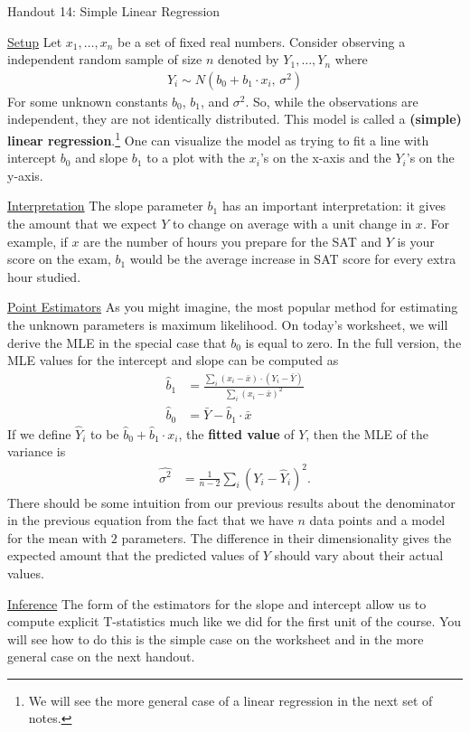 \documentclass{tufte-handout}
\begin{document}
\justify

{\LARGE Handout 14: Simple Linear Regression}

\vspace*{18pt}

\noindent
\underline{Setup}
Let $x_1, \ldots, x_n$ be a set of fixed real numbers.
Consider observing a independent random sample of size $n$ denoted
by $Y_1, \ldots, Y_n$ where
\begin{align*}
Y_i \sim N(b_0 + b_1 \cdot x_i, \, \sigma^2)
\end{align*}
For some unknown constants $b_0$, $b_1$, and $\sigma^2$. So, while
the observations are independent, they are not identically distributed.
This model is called a \textbf{(simple) linear regression}.\footnote{
  We will see the more general case of a linear regression in the next
  set of notes.
}
One can visualize the model as trying to fit a line with intercept $b_0$
and slope $b_1$ to a plot with the $x_i$'s on the x-axis and the $Y_i$'s on
the y-axis. 

\vspace*{12pt}

\noindent
\underline{Interpretation}
The slope parameter $b_1$ has an important interpretation: it gives
the amount that we expect $Y$ to change on average with a unit change
in $x$. For example, if $x$ are the number of hours you prepare for the
SAT and $Y$ is your score on the exam, $b_1$ would be the average
increase in SAT score for every extra hour studied.

\vspace*{12pt}

\noindent
\underline{Point Estimators}
As you might imagine, the most popular method for estimating the 
unknown parameters is maximum likelihood. On today's worksheet, we
will derive the MLE in the special case that $b_0$ is equal to zero.
In the full version, the MLE values for the intercept and slope can
be computed as
\begin{align*}
\widehat{b}_1 &= \frac{\sum_i (x_i - \bar{x}) \cdot (Y_i - \bar{Y})}{\sum_i (x_i - \bar{x})^2} \\
\widehat{b}_0 &= \bar{Y} -  \widehat{b}_1 \cdot \bar{x}
\end{align*}
If we define $\widehat{Y}_i$ to be $\widehat{b}_0 + \widehat{b}_1 \cdot x_i$,
the \textbf{fitted value} of $Y$, then the MLE of the variance is
\begin{align*}
\widehat{\sigma^2} &= \frac{1}{n-2} \sum_i (Y_i - \widehat{Y}_i)^2.
\end{align*}
There should be some intuition from our previous results about the
denominator in the previous equation from the fact that we have
$n$ data points and a model for the mean with $2$ parameters. The
difference in their dimensionality gives the expected amount that the
predicted values of $Y$ should vary about their actual values.

\vspace*{12pt}

\noindent
\underline{Inference}
The form of the estimators for the slope and intercept allow us to
compute explicit T-statistics much like we did for the first unit of
the course. You will see how to do this is the simple case on the 
worksheet and in the more general case on the next handout.
\end{document}
